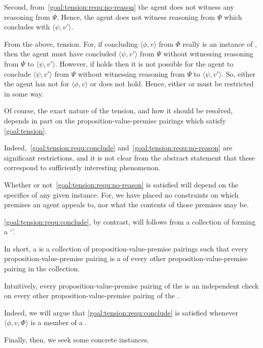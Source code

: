 \begin{note}[Goal]
  Second, from~\autoref{goal:tension:requ:no-reason} the agent does not witness any reasoning from \(\Psi\).
  Hence, the agent does not witness reasoning from \(\Psi\) which concludes with \(\langle \psi,v' \rangle\).

  From the above, tension.
  For, if concluding \(\langle \phi,v \rangle\) from \(\Phi\) really is an instance of \csN{}, then the agent must have concluded \(\langle \psi,v' \rangle\) from \(\Psi\) without witnessing reasoning from \(\Psi\) to \(\langle \psi,v' \rangle\).
  However, if \ESU{} holds then it is not possible for the agent to conclude \(\langle \psi,v' \rangle\) from \(\Psi\) without witnessing reasoning from \(\Psi\) to \(\langle \psi,v' \rangle\).
  So, either the agent has not \csN{} for \(\langle \phi,v \rangle\) or \ESU{} does not hold.
  Hence, either \csN{} or \ESU{} must be restricted in some way.

  Of course, the exact nature of the tension, and how it should be resolved, depends in part on the proposition-value-premise pairings which satisfy \autoref{goal:tension}.

  Indeed,~\autoref{goal:tension:requ:conclude} and~\autoref{goal:tension:requ:no-reason} are significant restrictions, and it is not clear from the abstract statement that these correspond to sufficiently interesting phenomenon.
\end{note}

\begin{note}
  Whether or not~\autoref{goal:tension:requ:no-reason} is satisfied will depend on the specifics of any given instance.
  For, we have placed no constraints on which premises an agent appeals to, nor what the contents of those premises may be.

  \autoref{goal:tension:requ:conclude}, by contrast, will follows from a collection of  forming a `\cluster{}'.

  In short, a \cluster{} is a collection of proposition-value-premise pairings such that every proposition-value-premise pairing is a \requ{} of every other proposition-value-premise pairing in the collection.

  Intuitively, every proposition-value-premise pairing of the  is an independent check on every other proposition-value-premise pairing of the .

  Indeed, we will argue that \autoref{goal:tension:requ:conclude} is satisfied whenever \(\langle \phi,v,\Phi \rangle\) is a member of a \cluster{}.

  Finally, then, we seek some concrete instances.
\end{note}

